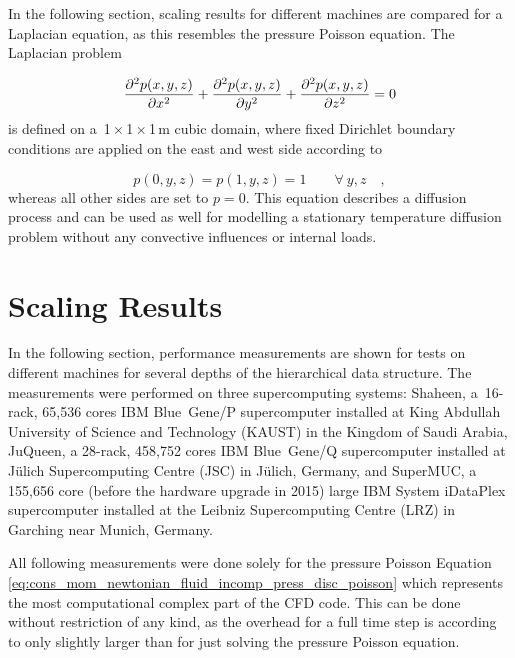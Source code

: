 \documentclass[10pt, conference, compsocconf]{IEEEtran}
\newcommand{\partAbl}[2]{\frac{\partial #1}{\partial #2}}
\begin{document}
In the following section, scaling results for different machines are compared for a Laplacian equation, as this resembles the pressure Poisson equation. The Laplacian problem \vspace{-4pt}

\begin{equation}
\label{eq:adap_prob_setup}
\partAbl{^2 p(x,y,z)}{x^2} + \partAbl{^2 p(x,y,z)}{y^2} + \partAbl{^2 p(x,y,z)}{z^2} = 0 \vspace{6pt}
\end{equation}
is defined on a~1\,$\times$\,1\,$\times$\,1\,m cubic domain, where fixed Dirichlet boundary conditions are applied on the east and west side according to \vspace{-8pt}

\begin{equation}
\label{eq:adap_prob_setup_bc_east_west}
p(0,y,z) = p(1,y,z) = 1 \qquad \forall~ y,z \quad ,
\end{equation}
whereas all other sides are set to $p=0$. This equation describes a diffusion process and can be used as well for modelling a stationary temperature diffusion problem without any convective influences or internal loads.


\section{Scaling Results}
\label{sec:scaling}

In the following section, performance measurements are shown for tests on different machines for several depths of the hierarchical data structure. The measurements were performed on three supercomputing systems: Shaheen, a~16-rack, 65,536 cores IBM Blue~Gene/P supercomputer installed at King Abdullah University of Science and Technology (KAUST) in the Kingdom of Saudi Arabia, JuQueen, a 28-rack, 458,752 cores IBM Blue~Gene/Q supercomputer installed at J\"ulich Supercomputing Centre (JSC) in J\"ulich, Germany, and SuperMUC, a 155,656 core (before the hardware upgrade in 2015) large IBM System iDataPlex supercomputer installed at the Leibniz Supercomputing Centre (LRZ) in Garching near Munich, Germany.

All following measurements were done solely for the pressure Poisson Equation \eqref{eq:cons_mom_newtonian_fluid_incomp_press_disc_poisson} which represents the most computational complex part of the CFD code. This can be done without restriction of any kind, as the overhead for a full time step is according to \cite{Frisch2014Diss} only slightly larger than for just solving the pressure Poisson equation.
\end{document}
